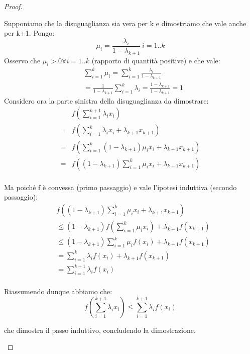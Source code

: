 \begin{teorema}
\begin{proof}
\begin{description}
Supponiamo che la disuguaglianza sia vera per k e dimostriamo che vale anche per k+1.
Pongo:
\[
 \mu_i=\frac{\lambda_i}{1-\lambda_{k+1}} \ i=1..k
\]
Osservo che $\mu_i>0 \forall i=1..k$ (rapporto di quantità positive) e che vale:
\[\begin{split}
 & \sum_{i=1}^k \mu_i=\sum_{i=1}^k \frac{\lambda_i}{1-\lambda_{k+1}} \\
 &= \frac{1}{1-\lambda_{k+1}} \sum_{i=1}^k \lambda_i
 = \frac{1-\lambda_{k+1}}{1-\lambda_{k+1}}=1
 \end{split}
\]
Considero ora la parte sinistra della disuguaglianza da dimostrare:
\[\begin{split}
 & f \left( \sum_{i=1}^{k+1} \lambda_i x_i \right) \\
 = & f \left( \sum_{i=1}^k \lambda_i x_i +\lambda_{k+1}x_{k+1} \right) \\
 = & f \left( \sum_{i=1}^k (1-\lambda_{k+1}) \mu_i x_i +\lambda_{k+1}x_{k+1} \right) \\
 = & f \left( (1-\lambda_{k+1}) \sum_{i=1}^k \mu_i x_i +\lambda_{k+1}x_{k+1} \right) \\
 \end{split}
\]

Ma poiché f è convessa (primo passaggio) e vale l'ipotesi induttiva (secondo passaggio):
\[\begin{split}
 & f \left( (1-\lambda_{k+1}) \sum_{i=1}^k \mu_i x_i +\lambda_{k+1}x_{k+1} \right) \\
 & \le (1-\lambda_{k+1})  f \left( \sum_{i=1}^k \mu_i x_i\right) +\lambda_{k+1} f(x_{k+1})  \\
 & \le (1-\lambda_{k+1})  \sum_{i=1}^k \mu_i f(x_i) +\lambda_{k+1} f(x_{k+1})  \\
 & = \sum_{i=1}^k \lambda_i f(x_i) +\lambda_{k+1} f(x_{k+1}) \\
 &= \sum_{i=1}^{k+1} \lambda_i f(x_i) \\
 \end{split}
\]

Riassumendo dunque abbiamo che:
\[
f \left( \sum_{i=1}^{k+1} \lambda_i x_i \right) \le \sum_{i=1}^{k+1} \lambda_i f(x_i)
\]

che dimostra il passo induttivo, concludendo la dimostrazione.
\end{description}
\end{proof}
\label{jensen}
\end{teorema}

